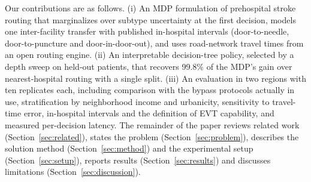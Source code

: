 Our contributions are as follows. (i) An MDP formulation of prehospital stroke routing that marginalizes over subtype uncertainty at the first decision, models one inter-facility transfer with published in-hospital intervals (door-to-needle, door-to-puncture and door-in-door-out), and uses road-network travel times from an open routing engine. (ii) An interpretable decision-tree policy, selected by a depth sweep on held-out patients, that recovers 99.8\% of the MDP's gain over nearest-hospital routing with a single split. (iii) An evaluation in two regions with ten replicates each, including comparison with the bypass protocols actually in use, stratification by neighborhood income and urbanicity, sensitivity to travel-time error, in-hospital intervals and the definition of EVT capability, and measured per-decision latency. The remainder of the paper reviews related work (Section~\ref{sec:related}), states the problem (Section~\ref{sec:problem}), describes the solution method (Section~\ref{sec:method}) and the experimental setup (Section~\ref{sec:setup}), reports results (Section~\ref{sec:results}) and discusses limitations (Section~\ref{sec:discussion}).
